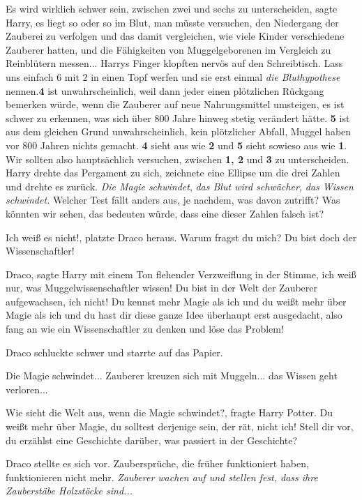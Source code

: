 \glqq{}Es wird wirklich schwer sein, zwischen zwei und sechs zu
unterscheiden\grqq{}, sagte Harry, \glqq{}es liegt so oder so im Blut, man müsste
versuchen, den Niedergang der Zauberei zu verfolgen und das damit vergleichen,
wie viele Kinder verschiedene Zauberer hatten, und die Fähigkeiten von
Muggelgeborenen im Vergleich zu Reinblütern messen...\grqq{} Harrys Finger
klopften nervös auf den Schreibtisch. \glqq{}Lass uns einfach 6 mit 2 in einen
Topf werfen und sie erst einmal \emph{die Bluthypothese} nennen.\textbf{4} ist
unwahrscheinlich, weil dann jeder einen plötzlichen Rückgang bemerken würde,
wenn die Zauberer auf neue Nahrungsmittel umsteigen, es ist schwer zu erkennen,
was sich über 800 Jahre hinweg stetig verändert hätte. \textbf{5} ist aus dem
gleichen Grund unwahrscheinlich, kein plötzlicher Abfall, Muggel haben vor 800
Jahren nichts gemacht. \textbf{4} sieht aus wie \textbf{2} und \textbf{5} sieht
sowieso aus wie \textbf{1}. Wir sollten also hauptsächlich versuchen, zwischen
\textbf{1, 2} und \textbf{3} zu unterscheiden.\grqq{} Harry drehte das Pergament
zu sich, zeichnete eine Ellipse um die drei Zahlen und drehte es zurück. \glqq
\emph{Die Magie schwindet}, \emph{das Blut wird schwächer,} \emph{das Wissen
schwindet.} Welcher Test fällt anders aus, je nachdem, was davon zutrifft? Was
könnten wir sehen, das bedeuten würde, dass eine dieser Zahlen falsch
ist?\grqq{}

\glqq{}Ich weiß es nicht!\grqq{}, platzte Draco heraus. \glqq{}Warum fragst du
mich? Du bist doch der Wissenschaftler!\grqq{}

\glqq{}Draco\grqq{}, sagte Harry mit einem Ton flehender Verzweiflung in der
Stimme, \glqq{}ich weiß nur, was Muggelwissenschaftler wissen! Du bist in der
Welt der Zauberer aufgewachsen, ich nicht! Du kennst mehr Magie als ich und du
weißt mehr über Magie als ich und du hast dir diese ganze Idee überhaupt erst
ausgedacht, also fang an wie ein Wissenschaftler zu denken und löse das
Problem!\grqq{}

Draco schluckte schwer und starrte auf das Papier.

Die Magie schwindet... Zauberer kreuzen sich mit Muggeln... das Wissen geht
verloren...

\glqq{}Wie sieht die Welt aus, wenn die Magie schwindet?\grqq{}, fragte Harry
Potter. \glqq{}Du weißt mehr über Magie, du solltest derjenige sein, der rät,
nicht ich! Stell dir vor, du erzählst eine Geschichte darüber, was passiert in
der Geschichte?\grqq{}

Draco stellte es sich vor. \glqq{}Zaubersprüche, die früher funktioniert haben,
funktionieren nicht mehr.\grqq{} \emph{Zauberer wachen auf und stellen fest,
dass ihre Zauberstäbe Holzstöcke sind...}

